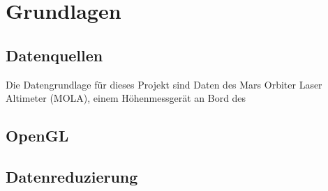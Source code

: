 \chapter{Grundlagen}

\section{Datenquellen}
Die Datengrundlage für dieses Projekt sind Daten des Mars Orbiter Laser Altimeter (MOLA), einem Höhenmessgerät an Bord des 
               




\section{OpenGL}

\section{Datenreduzierung}\label{datenreduzierung}

